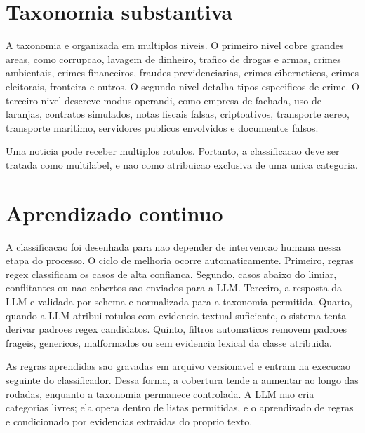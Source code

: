 \documentclass[12pt]{article}
\begin{document}
\section{Taxonomia substantiva}

A taxonomia e organizada em multiplos niveis. O primeiro nivel cobre grandes areas, como corrupcao, lavagem de dinheiro, trafico de drogas e armas, crimes ambientais, crimes financeiros, fraudes previdenciarias, crimes ciberneticos, crimes eleitorais, fronteira e outros. O segundo nivel detalha tipos especificos de crime. O terceiro nivel descreve modus operandi, como empresa de fachada, uso de laranjas, contratos simulados, notas fiscais falsas, criptoativos, transporte aereo, transporte maritimo, servidores publicos envolvidos e documentos falsos.

Uma noticia pode receber multiplos rotulos. Portanto, a classificacao deve ser tratada como multilabel, e nao como atribuicao exclusiva de uma unica categoria.

\section{Aprendizado continuo}

A classificacao foi desenhada para nao depender de intervencao humana nessa etapa do processo. O ciclo de melhoria ocorre automaticamente. Primeiro, regras regex classificam os casos de alta confianca. Segundo, casos abaixo do limiar, conflitantes ou nao cobertos sao enviados para a LLM. Terceiro, a resposta da LLM e validada por schema e normalizada para a taxonomia permitida. Quarto, quando a LLM atribui rotulos com evidencia textual suficiente, o sistema tenta derivar padroes regex candidatos. Quinto, filtros automaticos removem padroes frageis, genericos, malformados ou sem evidencia lexical da classe atribuida.

As regras aprendidas sao gravadas em arquivo versionavel e entram na execucao seguinte do classificador. Dessa forma, a cobertura tende a aumentar ao longo das rodadas, enquanto a taxonomia permanece controlada. A LLM nao cria categorias livres; ela opera dentro de listas permitidas, e o aprendizado de regras e condicionado por evidencias extraidas do proprio texto.
\end{document}
